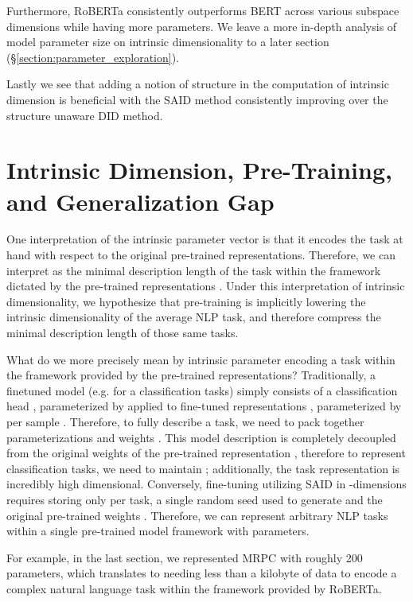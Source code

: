 \documentclass{article} \usepackage{iclr2020_conference,times}
\begin{document}
Furthermore, RoBERTa consistently outperforms BERT across various subspace dimensions  while having more parameters. We leave a more in-depth analysis of model parameter size on intrinsic dimensionality to a later section (\S\ref{section:parameter_exploration}).

Lastly we see that adding a notion of structure in the computation of intrinsic dimension is beneficial with the SAID method consistently improving over the structure unaware DID method.

\section{Intrinsic Dimension, Pre-Training, and Generalization Gap}
One interpretation of the intrinsic parameter vector is that it encodes the task at hand with respect to the original pre-trained representations. Therefore, we can interpret  as the minimal description length of the task within the framework dictated by the pre-trained representations \citep{min_desc_length}. Under this interpretation of intrinsic dimensionality, we hypothesize that pre-training is implicitly lowering the intrinsic dimensionality of the average NLP task, and therefore compress the minimal description length of those same tasks.

What do we more precisely mean by intrinsic parameter encoding a task within the framework provided by the pre-trained representations? Traditionally, a finetuned model (e.g. for a classification tasks) simply consists of a classification head , parameterized by  applied to fine-tuned representations , parameterized by  per sample . Therefore, to fully describe a task, we need to pack together parameterizations and weights . This model description is completely decoupled from the original weights of the pre-trained representation , therefore to represent  classification tasks, we need to maintain ; additionally, the task representation is incredibly high dimensional. Conversely, fine-tuning utilizing SAID in -dimensions requires storing only  per task, a single random seed used to generate  and the original pre-trained weights . Therefore, we can represent arbitrary NLP tasks within a single pre-trained model framework with  parameters.

For example, in the last section, we represented MRPC with roughly 200 parameters, which translates to needing less than a kilobyte of data to encode a complex natural language task within the framework provided by RoBERTa.
\end{document}
